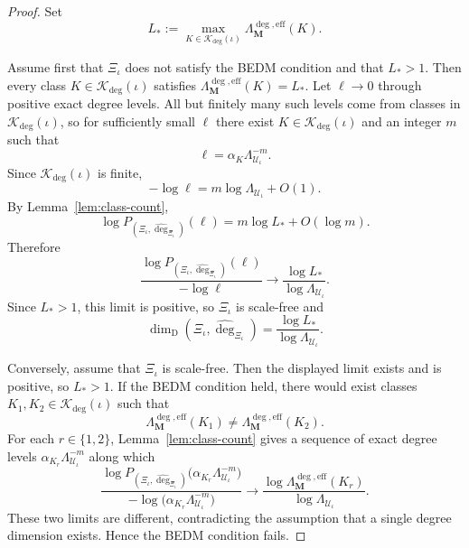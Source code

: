 \documentclass[12pt]{iopart}
\newcommand*{\dimdeg}{\dim_\mathrm{D}}
\begin{document}
\begin{proof}
Set
\[
L_*
:=
\max_{K\in\mathscr K_{\deg}(\iota)}
\Lambda_{\mathbf M}^{\deg,\mathrm{eff}}(K).
\]

Assume first that $\Xi_\iota$ does not satisfy the BEDM condition and that $L_*>1$.
Then every class $K\in\mathscr K_{\deg}(\iota)$ satisfies
$\Lambda_{\mathbf M}^{\deg,\mathrm{eff}}(K)=L_*$.
Let $\ell\to 0$ through positive exact degree levels.
All but finitely many such levels come from classes in $\mathscr K_{\deg}(\iota)$, so for sufficiently small $\ell$ there exist
$K\in\mathscr K_{\deg}(\iota)$ and an integer $m$ such that
\[
\ell=\alpha_K\Lambda_{\mathcal U_\iota}^{-m}.
\]
Since $\mathscr K_{\deg}(\iota)$ is finite,
\[
-\log \ell
=
m\log \Lambda_{\mathcal U_\iota}+O(1).
\]
By Lemma~\ref{lem:class-count},
\[
\log P_{(\Xi_\iota,\hat{\deg}_{\Xi_\iota})}(\ell)
=
m\log L_*+O(\log m).
\]
Therefore
\[
\frac{
\log P_{(\Xi_\iota,\hat{\deg}_{\Xi_\iota})}(\ell)
}{
-\log \ell
}
\to
\frac{\log L_*}{\log \Lambda_{\mathcal U_\iota}}.
\]
Since $L_*>1$, this limit is positive, so $\Xi_\iota$ is scale-free and
\[
\dimdeg(\Xi_\iota,\hat{\deg}_{\Xi_\iota})
=
\frac{\log L_*}{\log \Lambda_{\mathcal U_\iota}}.
\]

Conversely, assume that $\Xi_\iota$ is scale-free.
Then the displayed limit exists and is positive, so $L_*>1$.
If the BEDM condition held, there would exist classes $K_1,K_2\in\mathscr K_{\deg}(\iota)$ such that
\[
\Lambda_{\mathbf M}^{\deg,\mathrm{eff}}(K_1)
\ne
\Lambda_{\mathbf M}^{\deg,\mathrm{eff}}(K_2).
\]
For each $r\in\{1,2\}$, Lemma~\ref{lem:class-count} gives a sequence of exact degree levels
$\alpha_{K_r}\Lambda_{\mathcal U_\iota}^{-m}$ along which
\[
\frac{
\log P_{(\Xi_\iota,\hat{\deg}_{\Xi_\iota})}
\big(\alpha_{K_r}\Lambda_{\mathcal U_\iota}^{-m}\big)
}{
-\log\big(\alpha_{K_r}\Lambda_{\mathcal U_\iota}^{-m}\big)
}
\to
\frac{
\log \Lambda_{\mathbf M}^{\deg,\mathrm{eff}}(K_r)
}{
\log \Lambda_{\mathcal U_\iota}
}.
\]
These two limits are different, contradicting the assumption that a single degree dimension exists.
Hence the BEDM condition fails.
\end{proof}
\end{document}

